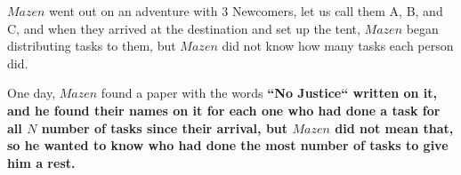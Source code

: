 $Mazen$ went out on an adventure with $3$ Newcomers, let us call them A, B, and C, and when they arrived at the destination and set up the tent, $Mazen$ began distributing tasks to them, but $Mazen$ did not know how many tasks each person did. 

One day, $Mazen$ found a paper with the words \bf{``No Justice``} written on it, and he found their names on it for each one who had done a task for all $N$ number of tasks since their arrival, but $Mazen$ did not mean that, so he wanted to know who had done the most number of tasks to give him a rest.